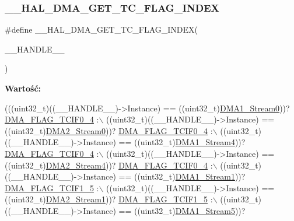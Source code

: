 \subsubsection{\texorpdfstring{\+\_\+\+\_\+\+H\+A\+L\+\_\+\+D\+M\+A\+\_\+\+G\+E\+T\+\_\+\+T\+C\+\_\+\+F\+L\+A\+G\+\_\+\+I\+N\+D\+EX}{\_\_HAL\_DMA\_GET\_TC\_FLAG\_INDEX}}
{\footnotesize\ttfamily \#define \+\_\+\+\_\+\+H\+A\+L\+\_\+\+D\+M\+A\+\_\+\+G\+E\+T\+\_\+\+T\+C\+\_\+\+F\+L\+A\+G\+\_\+\+I\+N\+D\+EX(\begin{DoxyParamCaption}\item[{}]{\+\_\+\+\_\+\+H\+A\+N\+D\+L\+E\+\_\+\+\_\+ }\end{DoxyParamCaption})}

{\bfseries Wartość\+:}
\begin{DoxyCode}
(((uint32\_t)((\_\_HANDLE\_\_)->Instance) == ((uint32\_t)\hyperlink{group___peripheral__declaration_ga61247dd5d594289c404dd8774202dfd8}{DMA1\_Stream0}))? 
      \hyperlink{group___d_m_a__flag__definitions_ga19dfe70176841c6972818e279ba02436}{DMA\_FLAG\_TCIF0\_4} :\(\backslash\)
 ((uint32\_t)((\_\_HANDLE\_\_)->Instance) == ((uint32\_t)\hyperlink{group___peripheral__declaration_ga3a2efe5fd7a7a79be3b08a1670bbd016}{DMA2\_Stream0}))? 
      \hyperlink{group___d_m_a__flag__definitions_ga19dfe70176841c6972818e279ba02436}{DMA\_FLAG\_TCIF0\_4} :\(\backslash\)
 ((uint32\_t)((\_\_HANDLE\_\_)->Instance) == ((uint32\_t)\hyperlink{group___peripheral__declaration_ga87df45f4b82e0b3a8c1b17f1a77aecdb}{DMA1\_Stream4}))? 
      \hyperlink{group___d_m_a__flag__definitions_ga19dfe70176841c6972818e279ba02436}{DMA\_FLAG\_TCIF0\_4} :\(\backslash\)
 ((uint32\_t)((\_\_HANDLE\_\_)->Instance) == ((uint32\_t)\hyperlink{group___peripheral__declaration_gae32674772021620800275dd3b6d62c2f}{DMA2\_Stream4}))? 
      \hyperlink{group___d_m_a__flag__definitions_ga19dfe70176841c6972818e279ba02436}{DMA\_FLAG\_TCIF0\_4} :\(\backslash\)
 ((uint32\_t)((\_\_HANDLE\_\_)->Instance) == ((uint32\_t)\hyperlink{group___peripheral__declaration_gaf7d82f110f19982d483eebc465d222b2}{DMA1\_Stream1}))? 
      \hyperlink{group___d_m_a__flag__definitions_ga9546185449ae979fad0aa5e33310c0ab}{DMA\_FLAG\_TCIF1\_5} :\(\backslash\)
 ((uint32\_t)((\_\_HANDLE\_\_)->Instance) == ((uint32\_t)\hyperlink{group___peripheral__declaration_gae96f15d34d3c41c16fce69bc2878151a}{DMA2\_Stream1}))? 
      \hyperlink{group___d_m_a__flag__definitions_ga9546185449ae979fad0aa5e33310c0ab}{DMA\_FLAG\_TCIF1\_5} :\(\backslash\)
 ((uint32\_t)((\_\_HANDLE\_\_)->Instance) == ((uint32\_t)\hyperlink{group___peripheral__declaration_gac3abc20f80e25c19b02104ad34eae652}{DMA1\_Stream5}))? 

\end{DoxyCode}
